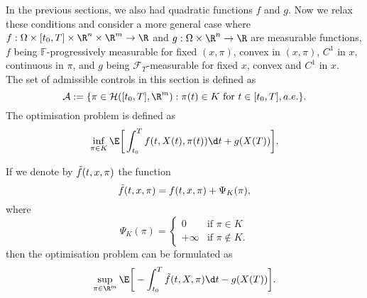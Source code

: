 In the previous sections, we also had quadratic functions $f$ and $g$. Now we relax these conditions and consider a more general case where $f: \Omega \times [t_0, T] \times \R^n \times \R^m \to \R$ and $g: \Omega \times \R^n \to \R$ are measurable functions, $f$ being $\mathbb{F}$-progressively measurable for fixed $(x, \pi)$, convex in $(x, \pi)$, $C^1$ in $x$, continuous in $\pi$, and $g$ being $\mathcal{F}_T$-measurable for fixed $x$, convex and $C^1$ in $x$.\\

The set of admissible controls in this section is defined as
\begin{equation*}
    \mathcal{A}:= \{ \pi \in \mathcal{H}([t_0, T], \R^m) : \pi(t) \in K \text{ for } t \in [t_0, T], a.e.  \}.
\end{equation*}
The optimisation problem is defined as 
\begin{equation}
    \inf_{\pi \in K} \E \bigg[ \int_{t_0}^T f(t,X(t), \pi(t)) \d t + g(X(T)) \bigg].\label{eq: constrained_primal_optimisation_problem}
\end{equation}

If we denote by $\Tilde{f}(t,x,\pi)$ the function
\begin{equation*}
    \Tilde{f}(t,x,\pi) = f(t,x,\pi) + \Psi_K(\pi),
\end{equation*}
where 
\begin{equation*}
    \Psi_K(\pi) = \begin{cases}
        0 &\text{if } \pi \in K\\
        + \infty &\text{if } \pi \not \in K.
    \end{cases}
\end{equation*}
then the optimisation problem can be formulated as
\begin{equation}
    \sup_{\pi \in \R^m} \E \bigg[ - \int_{t_0}^T \Tilde{f}(t,X,\pi) \d t -  g(X(T))\bigg]. \label{eq: constrained_primal_optimisation_problem_tilde}
\end{equation}


